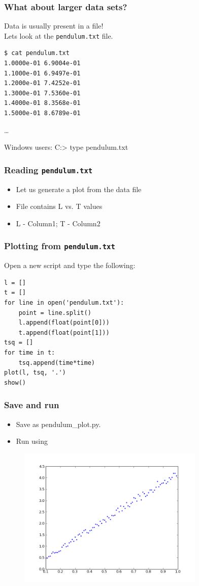\documentclass[14pt,compress]{beamer}
\newcounter{time}
\newcommand{\typ}[1]{\lstinline{#1}}
\newcommand{\kwrd}[1]{ \texttt{\textbf{\color{blue}{#1}}}  }
\begin{document}
\begin{frame}[fragile]
\frametitle{What about larger data sets?}
\alert{Data is usually present in a file!} \\
Lets look at the \typ{pendulum.txt} file.
\begin{lstlisting} 
$ cat pendulum.txt 
1.0000e-01 6.9004e-01
1.1000e-01 6.9497e-01
1.2000e-01 7.4252e-01
1.3000e-01 7.5360e-01
1.4000e-01 8.3568e-01
1.5000e-01 8.6789e-01
\end{lstlisting}  %
\ldots
\begin{block}{Windows users:}
  C:> type pendulum.txt
\end{block}
\end{frame}

\begin{frame}[fragile]
\frametitle{Reading \typ{pendulum.txt}}
\begin{itemize}
  \item Let us generate a plot from the data file
  \item File contains L vs. T values 
  \item L - Column1; T - Column2
\end{itemize}
\end{frame}

\begin{frame}[fragile]
\frametitle{Plotting from \typ{pendulum.txt}}
Open a new script and type the following:
\begin{lstlisting}
l = []
t = []
for line in open('pendulum.txt'):
    point = line.split()
    l.append(float(point[0]))
    t.append(float(point[1]))
tsq = []
for time in t:
    tsq.append(time*time)
plot(l, tsq, '.')
show()
\end{lstlisting}
\end{frame}

\begin{frame}
\frametitle{Save and run}
\begin{itemize}
  \item Save as pendulum\_plot.py.
  \item Run using \kwrd{\%run -i pendulum\_plot.py}
\end{itemize}
\end{frame}

\begin{frame}[fragile]
\begin{figure}
\includegraphics[width=3.5in]{data/L-Tsq.png}
\end{figure}
\end{frame}
\end{document}
